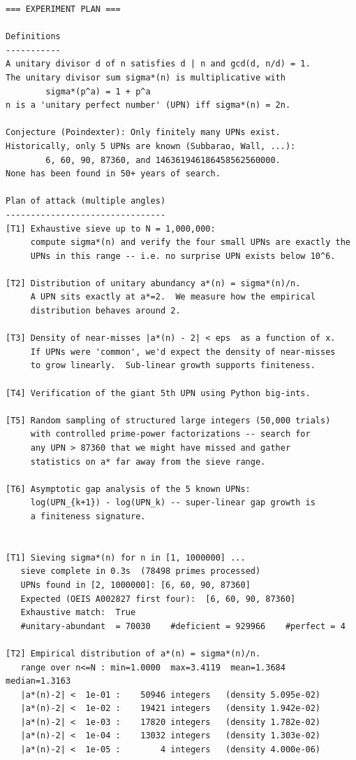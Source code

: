 \documentclass[11pt]{article}
\begin{document}
\begin{lstlisting}
=== EXPERIMENT PLAN ===

Definitions
-----------
A unitary divisor d of n satisfies d | n and gcd(d, n/d) = 1.
The unitary divisor sum sigma*(n) is multiplicative with
        sigma*(p^a) = 1 + p^a
n is a 'unitary perfect number' (UPN) iff sigma*(n) = 2n.

Conjecture (Poindexter): Only finitely many UPNs exist.
Historically, only 5 UPNs are known (Subbarao, Wall, ...):
        6, 60, 90, 87360, and 146361946186458562560000.
None has been found in 50+ years of search.

Plan of attack (multiple angles)
--------------------------------
[T1] Exhaustive sieve up to N = 1,000,000:
     compute sigma*(n) and verify the four small UPNs are exactly the
     UPNs in this range -- i.e. no surprise UPN exists below 10^6.

[T2] Distribution of unitary abundancy a*(n) = sigma*(n)/n.
     A UPN sits exactly at a*=2.  We measure how the empirical
     distribution behaves around 2.

[T3] Density of near-misses |a*(n) - 2| < eps  as a function of x.
     If UPNs were 'common', we'd expect the density of near-misses
     to grow linearly.  Sub-linear growth supports finiteness.

[T4] Verification of the giant 5th UPN using Python big-ints.

[T5] Random sampling of structured large integers (50,000 trials)
     with controlled prime-power factorizations -- search for
     any UPN > 87360 that we might have missed and gather
     statistics on a* far away from the sieve range.

[T6] Asymptotic gap analysis of the 5 known UPNs:
     log(UPN_{k+1}) - log(UPN_k) -- super-linear gap growth is
     a finiteness signature.


[T1] Sieving sigma*(n) for n in [1, 1000000] ...
   sieve complete in 0.3s  (78498 primes processed)
   UPNs found in [2, 1000000]: [6, 60, 90, 87360]
   Expected (OEIS A002827 first four):  [6, 60, 90, 87360]
   Exhaustive match:  True
   #unitary-abundant  = 70030    #deficient = 929966    #perfect = 4

[T2] Empirical distribution of a*(n) = sigma*(n)/n.
   range over n<=N : min=1.0000  max=3.4119  mean=1.3684  median=1.3163
   |a*(n)-2| <  1e-01 :    50946 integers   (density 5.095e-02)
   |a*(n)-2| <  1e-02 :    19421 integers   (density 1.942e-02)
   |a*(n)-2| <  1e-03 :    17820 integers   (density 1.782e-02)
   |a*(n)-2| <  1e-04 :    13032 integers   (density 1.303e-02)
   |a*(n)-2| <  1e-05 :        4 integers   (density 4.000e-06)


\end{lstlisting}
\end{document}

